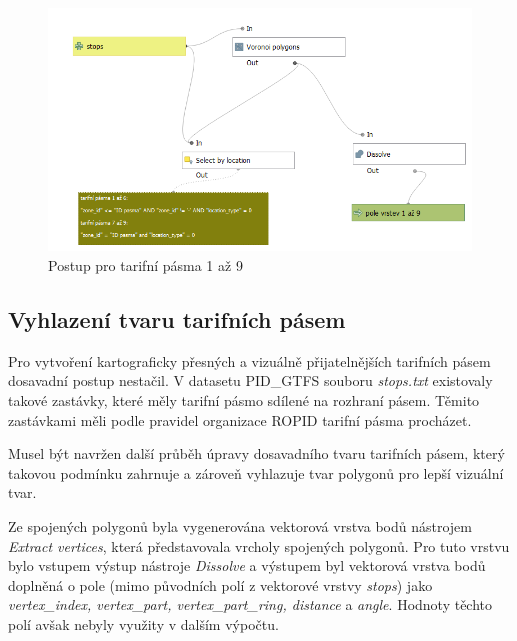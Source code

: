 \begin{figure}[H] \centering
    \includegraphics[width=400pt]{./pictures/postup-voronoi-1az9.png}
    \caption[Postup pro tarifní pásma 1 až 9]{Postup pro tarifní pásma 1 až 9}
	\label{fig:postup-voronoi-1az9}              
\end{figure}

\subsection{Vyhlazení tvaru tarifních pásem}
\label{vyhlazeni}

Pro vytvoření kartograficky přesných a vizuálně přijatelnějších tarifních pásem dosavadní postup nestačil.
V datasetu PID\_GTFS souboru \textit{stops.txt} existovaly takové zastávky, které měly tarifní pásmo sdílené
na rozhraní pásem. Těmito zastávkami měli podle pravidel organizace ROPID tarifní pásma procházet.

Musel být navržen další průběh úpravy dosavadního tvaru tarifních pásem, který takovou podmínku zahrnuje
a zároveň vyhlazuje tvar polygonů pro lepší vizuální tvar.  

Ze spojených polygonů byla vygenerována vektorová vrstva bodů nástrojem
\textit{Extract vertices}, která představovala vrcholy spojených polygonů. Pro tuto vrstvu
bylo vstupem výstup nástroje \textit{Dissolve} a výstupem byl vektorová vrstva bodů 
doplněná o pole (mimo původních polí z vektorové vrstvy \textit{stops}) jako \textit{vertex\_index,
vertex\_part, vertex\_part\_ring, distance} a \textit{angle}.
Hodnoty těchto polí avšak nebyly využity v dalším výpočtu.

